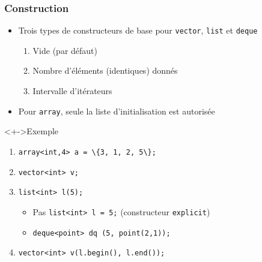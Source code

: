 \begin{frame}
\frametitle{Construction}
\begin{itemize}[<+->]
\item Trois types de constructeurs de base pour \texttt{vector}, \texttt{list} et \texttt{deque}
	\begin{enumerate}
	\item Vide (par défaut)
	\item Nombre d'éléments (identiques) donnés
	\item Intervalle d'itérateurs
	\end{enumerate}
\item Pour \texttt{array}, seule la liste d'initialisation est autorisée
\end{itemize}
\begin{exampleblock}<+->{Exemple}
	\begin{enumerate}[<+->]
	\item \lstinline|array<int,4> a = \{3, 1, 2, 5\};|
	\item \lstinline|vector<int> v;|
	\item \lstinline|list<int> l(5);|
		\begin{itemize}
		\item Pas \lstinline|list<int> l = 5;| (constructeur \lstinline|explicit|)
		\item \lstinline|deque<point> dq (5, point(2,1));|
		\end{itemize}
	\item \lstinline|vector<int> v(l.begin(), l.end());|
	\end{enumerate}
\end{exampleblock}
\end{frame}

